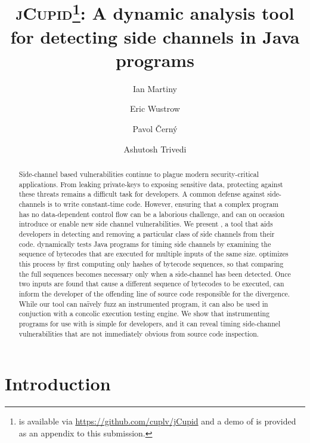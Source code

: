 \documentclass{llncs}
\begin{document}
\title{\textsc{jCupid}\thanks{\jcupid is available via
    \url{https://github.com/cuplv/jCupid} and a demo of \jcupid is provided  as
    an appendix to this submission.}: A dynamic analysis tool for detecting side channels in
  Java programs}
\author{
  Ian Martiny
  \and
  Eric Wustrow
  \and
  Pavol {\v C}ern\'y
  \and
  Ashutosh Trivedi
}


\maketitle

\begin{abstract}
  Side-channel based vulnerabilities continue to plague modern security-critical
  applications.
  From leaking private-keys to exposing sensitive data, 
  protecting against these threats remains a difficult task for developers. 
  A common defense against side-channels is to write constant-time code.
  However, ensuring that a complex program has no data-dependent control flow
  can be a laborious challenge, and can on occasion introduce or enable new side
  channel vulnerabilities.
  We present \jcupid, a tool that aids developers in detecting and
  removing a particular class of side channels from their code.
  \jcupid dynamically tests Java programs for timing side channels by examining
  the sequence of bytecodes that are executed for multiple inputs of the same size.
  \jcupid optimizes this process by first computing only hashes of bytecode sequences,
  so that comparing the full sequences becomes necessary only when a side-channel has been detected.
  Once two inputs are found that cause a different sequence of bytecodes to be
  executed, \jcupid can inform the developer of the offending line of source code
  responsible for the divergence.
  While our tool can na\"ively fuzz an instrumented program, it can also be used
  in conjuction with a concolic execution testing engine.
  We show that instrumenting programs for use with \jcupid is simple for
  developers, and it can reveal timing side-channel vulnerabilities
  that are not immediately obvious from source code inspection.
\end{abstract}



\section{Introduction}
\label{sec:introduction}

\end{document}
